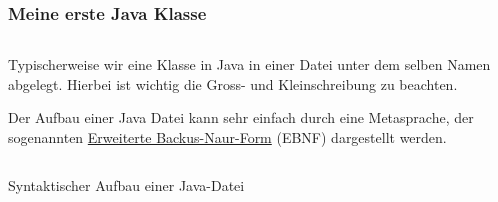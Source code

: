 \begin{frame}[fragile]
    \frametitle<presentation>{Meine erste Java Klasse}

    \inputminted[frame=single,samepage]{java}{../java/academy/HelloWorld.java}

\end{frame}

\mode*
{}

Typischerweise wir eine Klasse in Java in einer Datei unter dem selben Namen abgelegt.
Hierbei ist wichtig die Gross- und Kleinschreibung zu beachten.


Der Aufbau einer Java Datei kann sehr einfach durch eine Metasprache, der sogenannten
\href{https://de.wikipedia.org/wiki/Erweiterte_Backus-Naur-Form}{Erweiterte Backus-Naur-Form}
(EBNF) dargestellt werden.

\begin{listing}[h]
    \begin{center}
        \begin{minipage}{0.8\textwidth}
            \inputminted[firstline=41,lastline=46,frame=single,linenos]{antlr}{Java.g4}
        \end{minipage}
    \end{center}
    \caption{Syntaktischer Aufbau einer Java-Datei}
    \label{antlr:java-file}
\end{listing}



